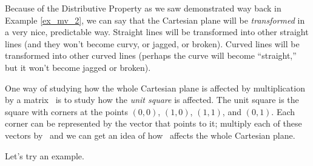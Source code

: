 %
%
%


Because of the Distributive Property as we saw demonstrated way back in Example \ref{ex_mv_2}, we can say that the Cartesian plane will be \textit{transformed} in a very nice, predictable way. Straight lines will be transformed into other straight lines (and they won't become curvy, or jagged, or broken). Curved lines will be transformed into other curved lines (perhaps the curve will become ``straight,'' but it won't become jagged or broken).

One way of studying how the whole Cartesian plane is affected by multiplication by a matrix \tta\ is to study how the \textit{unit square} is affected. The unit square is the square with corners at the points $(0,0)$, $(1,0)$, $(1,1)$, and $(0,1)$. Each corner can be represented by the vector that points to it; multiply each of these vectors by \tta\ and we can get an idea of how \tta\ affects the whole Cartesian plane. 

Let's try an example.\\

